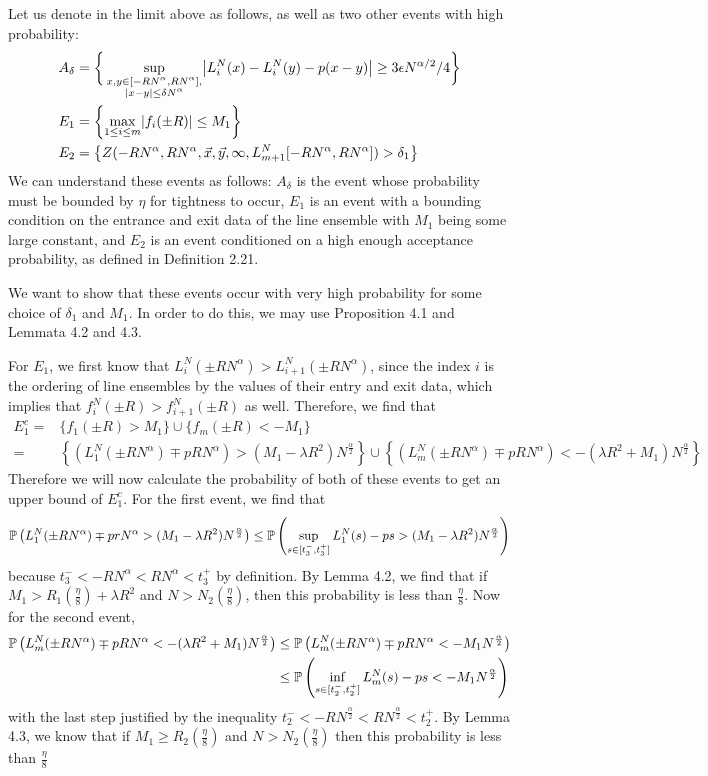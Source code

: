 	Let us denote in the limit above as follows, as well as two other events with high probability:
	\begin{align*}
	A_\delta&=\bigg\{\sup_{\substack{x,y\in [-RN^\alpha ,RN^\alpha],\\ |x-y|\leq\delta N^{\alpha}}} \abs*{L_i^N(x)-L_i^N(y)-p(x-y)}\geq 3\epsilon N^{\alpha/2}/4\bigg\}\\
	E_1&=\left\{\max_{1\leq i \leq m}\abs*{f_i(\pm R)}\leq M_1\right\}\\
	E_2&=\left\{Z(-RN^\alpha, RN^\alpha, \vec x, \vec y, \infty, L_{m+1}^N[-RN^\alpha, RN^\alpha])>\delta_1\right\}
	\end{align*}
	We can understand these events as follows: $A_\delta$ is the event whose probability must be bounded by $\eta$ for tightness to occur, $E_1$ is an event with a bounding condition on the entrance and exit data of the line ensemble with $M_1$ being some large constant, and $E_2$ is an event conditioned on a high enough acceptance probability, as defined in Definition 2.21.
	
	We want to show that these events occur with very high probability for some choice of $\delta_1$ and $M_1$. In order to do this, we may use Proposition 4.1 and Lemmata 4.2 and 4.3. 
	
	For $E_1$,  we first know that $L_i^N(\pm RN^\alpha)> L_{i+1}^N(\pm RN^\alpha)$, since the index $i$ is the ordering of line ensembles by the values of their entry and exit data, which implies that $f_i^N(\pm R)>f_{i+1}^N(\pm R)$ as well. Therefore, we find that
	\begin{align*}
	E_1^c=&\{f_1(\pm R)> M_1\} \cup \{f_m(\pm R)<-M_1\} \\
	=&\left\{ \left(L_1^N(\pm RN^\alpha)\mp pRN^\alpha\right)> (M_1-\lambda R^2)N^{\frac \alpha 2}\right\} \cup \left\{\left(L_m^N(\pm RN^\alpha)\mp pRN^\alpha\right)< -(\lambda R^2+M_1)N^{\frac\alpha 2}\right\}
	\end{align*}
	Therefore we will now calculate the probability of both of these events to get an upper bound of $E_1^c$. For the first event, we find that $$
	\mathbb{P}\left(L_1^N(\pm RN^\alpha)\mp prN^\alpha>(M_1-\lambda R^2)N^{\frac\alpha2}\right)
	\leq\mathbb{P}\left(\sup_{s\in[t_3^-,t_3^+]}L_1^N(s)-ps>(M_1-\lambda R^2)N^{\frac\alpha 2}\right)
	$$ because $t_3^-<-RN^\alpha<RN^\alpha<t_3^+$ by definition. By Lemma 4.2, we find that if $M_1>R_1(\frac{\eta}{8})+\lambda R^2$ and $N>N_2(\frac\eta 8)$, then this probability is less than $\frac\eta 8$.
	Now for the second event, \begin{align*}
	\mathbb{P} \left(L_m^N(\pm RN^\alpha)\mp pRN^\alpha< -(\lambda R^2+M_1)N^{\frac\alpha 2}\right)&\leq \mathbb{P} \left(L_m^N(\pm RN^\alpha)\mp pRN^\alpha< -M_1N^{\frac\alpha 2}\right)\\
	&\leq \mathbb{P}\left(\inf_{s\in[t_2^-,t_2^+]}L_m^N(s)-ps<-M_1N^{\frac{\alpha}{2}}\right)
	\end{align*}
	with the last step justified by the inequality $t_2^-<-RN^{\frac{\alpha}{2}}<RN^{\frac{\alpha}{2}}<t_2^+$. By Lemma 4.3, we know that if $M_1\geq R_2(\frac{\eta}{8})$ and $N>N_2(\frac{\eta}{8})$ then this probability is less than $\frac{\eta}{8}$
	
